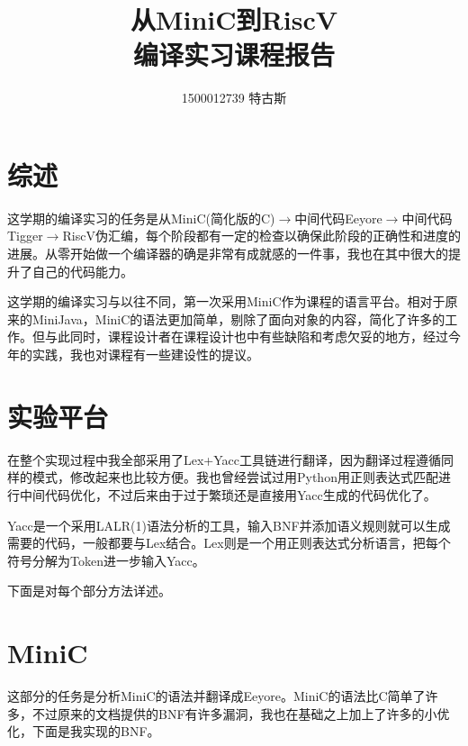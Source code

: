 \documentclass{ctexart}
\title{从MiniC到RiscV \\ \large 编译实习课程报告}
\author{1500012739 特古斯}
\begin{document}
\maketitle{}
\tableofcontents
\newpage

\section{综述}

这学期的编译实习的任务是从MiniC(简化版的C)$\rightarrow$中间代码Eeyore$\rightarrow$中间代码Tigger$\rightarrow$RiscV伪汇编，每个阶段都有一定的检查以确保此阶段的正确性和进度的进展。从零开始做一个编译器的确是非常有成就感的一件事，我也在其中很大的提升了自己的代码能力。

这学期的编译实习与以往不同，第一次采用MiniC作为课程的语言平台。相对于原来的MiniJava，MiniC的语法更加简单，剔除了面向对象的内容，简化了许多的工作。但与此同时，课程设计者在课程设计也中有些缺陷和考虑欠妥的地方，经过今年的实践，我也对课程有一些建设性的提议。

\section{实验平台}

在整个实现过程中我全部采用了Lex+Yacc工具链进行翻译，因为翻译过程遵循同样的模式，修改起来也比较方便。我也曾经尝试过用Python用正则表达式匹配进行中间代码优化，不过后来由于过于繁琐还是直接用Yacc生成的代码优化了。

Yacc是一个采用LALR(1)语法分析的工具，输入BNF并添加语义规则就可以生成需要的代码，一般都要与Lex结合。Lex则是一个用正则表达式分析语言，把每个符号分解为Token进一步输入Yacc。

下面是对每个部分方法详述。

\section{MiniC}

这部分的任务是分析MiniC的语法并翻译成Eeyore。MiniC的语法比C简单了许多，不过原来的文档提供的BNF有许多漏洞，我也在基础之上加上了许多的小优化，下面是我实现的BNF。
\end{document}
